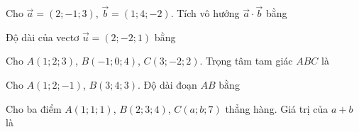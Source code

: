 \luyentap
{}
\begin{bai}Cho $\vec a=(2;-1;3)$, $\vec b=(1;4;-2)$. Tích vô hướng $\vec a\cdot\vec b$ bằng
\end{bai}
\begin{bai}Độ dài của vectơ $\vec u=(2;-2;1)$ bằng
\end{bai}
\begin{bai}Cho $A(1;2;3)$, $B(-1;0;4)$, $C(3;-2;2)$. Trọng tâm tam giác $ABC$ là
\end{bai}
\begin{bai}Cho $A(1;2;-1)$, $B(3;4;3)$. Độ dài đoạn $AB$ bằng
\end{bai}
\begin{bai}Cho ba điểm $A(1;1;1)$, $B(2;3;4)$, $C(a;b;7)$ thẳng hàng. Giá trị của $a+b$ là
\end{bai}

